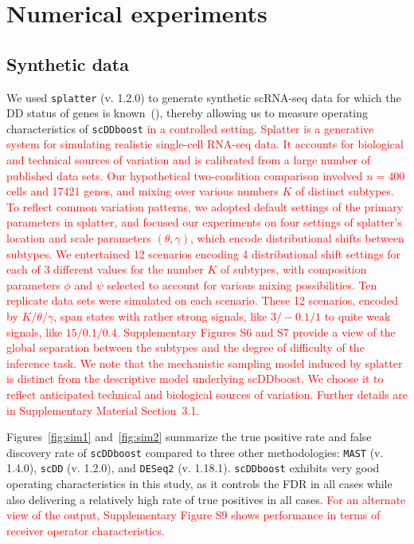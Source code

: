 \documentclass[aoas,preprint]{imsart}
\begin{document}
 
\section{Numerical experiments}

\subsection{Synthetic data} 
We used \verb+splatter+ (v. 1.2.0)  
to generate synthetic scRNA-seq  data for which the DD status of genes is known~(\cite{ref:Zappia}), 
 thereby allowing us to measure operating characteristics of \verb+scDDboost+ 
\textcolor{red}{in a controlled setting}.
 \textcolor{red}{Splatter is a generative system for simulating realistic
single-cell RNA-seq data. It accounts for biological and technical sources of variation and is calibrated
from a large number of published data sets. 
Our hypothetical two-condition comparison involved $n=400$ cells and
17421 genes, and mixing over various numbers $K$ of distinct subtypes. 
To reflect common variation patterns, we adopted default settings of the primary parameters in 
splatter, and focused our experiments on four settings of 
splatter's location and scale parameters $(\theta, \gamma)$, which encode distributional
shifts between subtypes. 
We entertained 12 scenarios encoding 4 distributional shift settings
for each of 3 different values for the number $K$ of subtypes, with composition parameters $\phi$ and
$\psi$ selected to account for various mixing possibilities. Ten replicate data sets were simulated
on each scenario. 
 These 12 scenarios, encoded by $K/\theta/\gamma$, span  states with rather strong signals, like
$3/-0.1/1$ to quite weak signals, like $15/0.1/0.4$.  Supplementary
Figures S6 and S7 provide a view of the global separation between the subtypes and the degree of difficulty of 
the inference task.  We note that the mechanistic sampling model induced by splatter is distinct from the descriptive model 
underlying scDDboost.  We choose it to reflect anticipated technical and biological sources of 
variation.  Further details are in Supplementary Material Section~3.1.}

Figures~\ref{fig:sim1} and~\ref{fig:sim2} summarize the true positive rate and false discovery rate
of \verb+scDDboost+ compared to three other methodologies: \verb+MAST+ (v. 1.4.0), \verb+scDD+ (v. 1.2.0), and 
\verb+DESeq2+ (v. 1.18.1). 
\verb+scDDboost+ exhibits very good operating characteristics in this study, as it controls the 
FDR in all cases while also delivering a relatively high rate of true positives in all cases.
\textcolor{red}{For an alternate view of the output, Supplementary Figure S9 shows performance in terms of receiver operator
characteristics.}
\end{document}

